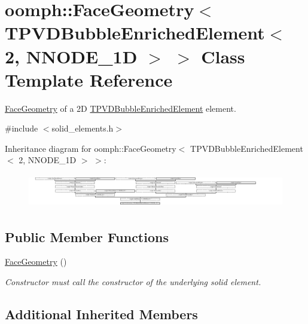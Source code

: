\hypertarget{classoomph_1_1FaceGeometry_3_01TPVDBubbleEnrichedElement_3_012_00_01NNODE__1D_01_4_01_4}{}\section{oomph\+:\+:Face\+Geometry$<$ T\+P\+V\+D\+Bubble\+Enriched\+Element$<$ 2, N\+N\+O\+D\+E\+\_\+1D $>$ $>$ Class Template Reference}
\label{classoomph_1_1FaceGeometry_3_01TPVDBubbleEnrichedElement_3_012_00_01NNODE__1D_01_4_01_4}


\hyperlink{classoomph_1_1FaceGeometry}{Face\+Geometry} of a 2D \hyperlink{classoomph_1_1TPVDBubbleEnrichedElement}{T\+P\+V\+D\+Bubble\+Enriched\+Element} element.  




{\ttfamily \#include $<$solid\+\_\+elements.\+h$>$}

Inheritance diagram for oomph\+:\+:Face\+Geometry$<$ T\+P\+V\+D\+Bubble\+Enriched\+Element$<$ 2, N\+N\+O\+D\+E\+\_\+1D $>$ $>$\+:\begin{figure}[H]
\begin{center}
\leavevmode
\includegraphics[height=1.468165cm]{classoomph_1_1FaceGeometry_3_01TPVDBubbleEnrichedElement_3_012_00_01NNODE__1D_01_4_01_4}
\end{center}
\end{figure}
\subsection*{Public Member Functions}
\begin{DoxyCompactItemize}
\item 
\hyperlink{classoomph_1_1FaceGeometry_3_01TPVDBubbleEnrichedElement_3_012_00_01NNODE__1D_01_4_01_4_a4582a47d17bb5c7a2255da3e855aa4ec}{Face\+Geometry} ()
\begin{DoxyCompactList}\small\item\em Constructor must call the constructor of the underlying solid element. \end{DoxyCompactList}\end{DoxyCompactItemize}
\subsection*{Additional Inherited Members}


